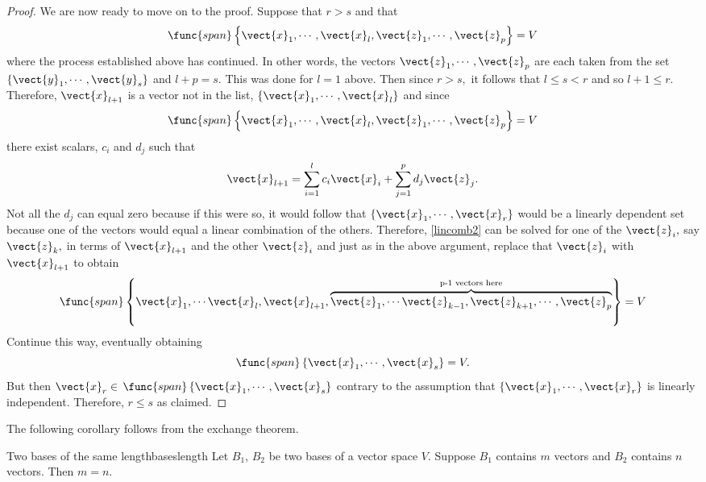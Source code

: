\begin{proof}
We are now ready to move on to the proof. Suppose that $r>s$ and that 
\[
\func{span}\left\{ \vect{x}_{1},\cdots ,
\vect{x}_{l},\vect{z}_{1},\cdots ,\vect{z}_{p}\right\} =V
\]
 where the process established above has continued. In other words, the vectors $\vect{z}_{1},\cdots ,\vect{z}_{p}$ are each taken from the
set $\left\{ \vect{y}_{1},\cdots ,\vect{y}_{s}\right\} $ and $l+p=s.$
This was done for $l=1$ above. Then since $r>s,$ it follows that $
l\leq s<r$ and so $l+1\leq r.$ Therefore, $\vect{x}_{l+1}$ is a vector not
in the list, $\left\{ \vect{x}_{1},\cdots ,\vect{x}_{l}\right\} $ and
since 
\[
\func{span}\left\{ \vect{x}_{1},\cdots ,\vect{x}_{l},\vect{z}
_{1},\cdots ,\vect{z}_{p}\right\} =V
\]
 there exist scalars, $c_{i}$ and $
d_{j}$ such that 
\begin{equation}
\vect{x}_{l+1}=\sum_{i=1}^{l}c_{i}\vect{x}_{i}+\sum_{j=1}^{p}d_{j}
\vect{z}_{j}.  \label{lincomb2}
\end{equation}
Not all the $d_{j}$ can equal zero because if this were so, it would follow
that $\left\{ \vect{x}_{1},\cdots ,\vect{x}_{r}\right\} $ would be a
linearly dependent set because one of the vectors would equal a linear
combination of the others. Therefore, \ref{lincomb2} can be solved for one of the 
$\vect{z}_{i},$ say $\vect{z}_{k},$ in terms of $\vect{x}_{l+1}$ and
the other $\vect{z}_{i}$ and just as in the above argument, replace that $
\vect{z}_{i}$ with $\vect{x}_{l+1}$ to obtain 
\begin{equation*}
\func{span}\left\{ \vect{x}_{1},\cdots \vect{x}_{l},\vect{x}_{l+1},
\overset{\text{p-1 vectors here}}{\overbrace{\vect{z}_{1},\cdots \vect{z}
_{k-1},\vect{z}_{k+1},\cdots ,\vect{z}_{p}}}\right\} =V
\end{equation*}
Continue this way, eventually obtaining 
\begin{equation*}
\func{span}\left\{ \vect{x}_{1},\cdots ,\vect{x}_{s}\right\} =V.
\end{equation*}
But then $\vect{x}_{r}\in $ $\func{span}\left\{ \vect{x}_{1},\cdots ,
\vect{x}_{s}\right\} $ contrary to the assumption that $\left\{ \vect{x}
_{1},\cdots ,\vect{x}_{r}\right\} $ is linearly independent. Therefore, $
r\leq s$ as claimed.
\end{proof}

The following corollary follows from the exchange theorem.

\begin{corollary}{Two bases of the same length}{baseslength}
Let $B_1$, $B_2$ be two bases of a vector space $V$. Suppose $B_1$ contains $m$ vectors and $B_2$ contains $n$ vectors. Then $m = n$.
\end{corollary}

